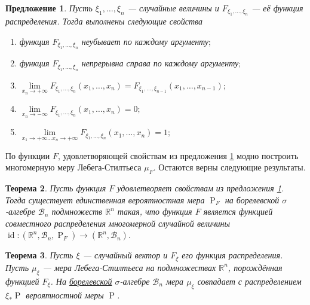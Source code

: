 \documentclass[12pt]{article}
\newtheorem{theorem}{Теорема}
\newtheorem{proposition}[theorem]{Предложение}
\numberwithin{theorem}{section}
\theoremstyle{definition}
\newcommand{\RR}{\mathbb{R}}
\newcommand{\calB}{\mathcal{B}}
\newcommand{\id}{\operatorname{id}}
\newcommand{\prob}{\operatorname{P}}
\begin{document}
	\begin{proposition} \label{joint distribution function properties}
		Пусть $ \xi_1,\ldots,\xi_n $ --- случайные величины и $ F_{\xi_1, \ldots, \xi_n} $ --- её функция распределения.
		Тогда выполнены следующие свойства
		\begin{enumerate}
			\item функция $ F_{\xi_1, \ldots, \xi_n} $ 
			неубывает по каждому аргументу$ ; $ \label{joint distribution function properties | monotonic}
			\item функция $ F_{\xi_1, \ldots, \xi_n} $ непрерывна справа по каждому аргументу$ ; $ \label{joint distribution function properties | right continuous}
			\item $ \lim\limits_{x_n \to +\infty} F_{\xi_1, \ldots, \xi_{n}}(x_1, \ldots, x_n) 
			= F_{\xi_1, \ldots, \xi_{n - 1}}(x_1, \ldots, x_{n - 1}); $ 
			\label{joint distribution function properties | at +inf}
			\item $ \lim\limits_{x_n \to -\infty} F_{\xi_1, \ldots, \xi_{n}}(x_1, \ldots, x_n) = 0; $
			\label{joint distribution function properties | 0 at -inf}
			\item $ \lim\limits_{x_1 \to +\infty \ldots x_n \to +\infty} F_{\xi_1, \ldots, \xi_{n}}(x_1, \ldots, x_n) = 1; $
			\label{joint distribution function properties | 1 at all +inf}
		\end{enumerate}
	\end{proposition}
	
	По функции $ F $, удовлетворяющей свойствам из предложения \ref{joint distribution function properties}
	модно построить многомерную меру Лебега-Стилтьеса $ \mu_F $.
	Остаются верны следующие результаты.
	
	\begin{theorem}
		Пусть функция $ F $ удовлетворяет свойствам из предложения \ref{joint distribution function properties}.
		Тогда существует единственная вероятностная мера $ \prob_F $ на борелевской $ \sigma $-алгебре $ \calB_n $
		подмножеств $ \RR^n $ такая, что функция $ F $ является функцией совместного распределения многомерной случайной величины
		$ \id \colon (\RR^n, \calB_n, \prob_F) \to (\RR^n, \calB_n) $.
	\end{theorem}
	
	\begin{theorem}
		Пусть $ \xi $ --- случайный вектор и $ F_\xi $ его функция распределения.
		Пусть $ \mu_\xi $ --- мера Лебега-Стилтьеса на подмножествах $ \RR^n $, порождённая функцией $ F_\xi $.
		На \hyperlink{borel-sigma-algebra}{борелевской} $ \sigma $-алгебре $ \calB_n $ мера $ \mu_\xi $ совпадает 
		с распределением $ \xi_*\prob $ вероятностной меры $ \prob $.
	\end{theorem}
	
\end{document}
